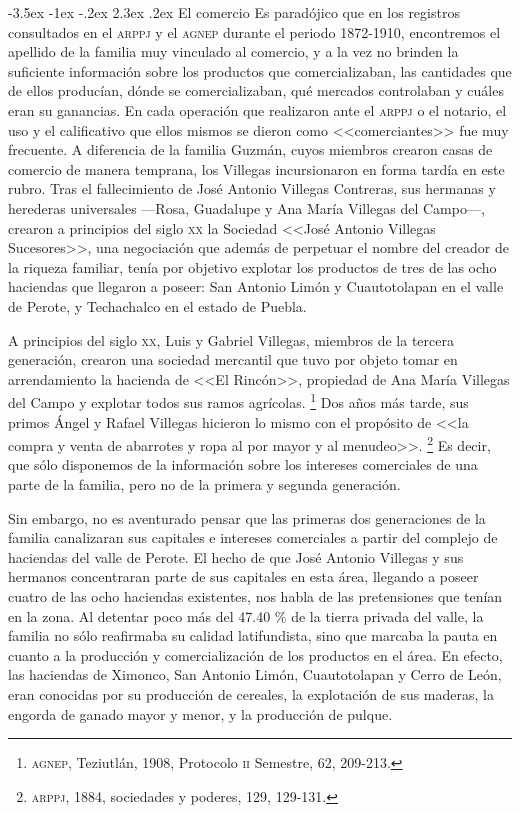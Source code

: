 \documentclass[14pt,twoside,final]{extbook} %
\makeatletter
\let\oldfootnote\footnote
\renewcommand\footnote[1]{%
\oldfootnote{\hspace{1mm}#1}}
\renewcommand\section{\@startsection {section}{1}{\z@}%
                                     {-3.5ex \@plus -1ex \@minus -.2ex}%
                                     {2.3ex \@plus .2ex}%
                                     {\normalfont\large\bfseries\sc}}
\makeatother
\begin{document}
\section{El comercio}\label{sec:el-comercio}
Es paradójico que en los registros consultados en el \textsc{arppj} y el \textsc{agnep} durante el
periodo 1872-1910, encontremos el apellido de la familia muy vinculado al comercio, y a la vez no brinden la suficiente información sobre los productos que comercializaban, las cantidades que de ellos producían, dónde se comercializaban, qué mercados controlaban y cuáles eran su ganancias. En cada operación que realizaron ante el \textsc{arppj} o el notario, el uso y el calificativo que ellos mismos se dieron como <<comerciantes>> fue muy frecuente. A diferencia de la familia Guzmán, cuyos miembros crearon casas de comercio de manera temprana, los Villegas incursionaron en forma tardía en este rubro. Tras el fallecimiento de José Antonio Villegas Contreras, sus hermanas y herederas universales ---Rosa, Guadalupe y Ana María Villegas del Campo---, crearon a principios del siglo \textsc{xx} la Sociedad <<José Antonio Villegas Sucesores>>, una negociación que además de perpetuar el nombre del creador de la riqueza familiar, tenía por objetivo explotar los productos de tres de las ocho haciendas que llegaron a poseer: San Antonio Limón y Cuautotolapan en el valle de Perote, y Techachalco en el estado de Puebla.

A principios del siglo \textsc{xx}, Luis y Gabriel Villegas, miembros de la tercera generación, crearon una sociedad mercantil que tuvo por objeto tomar en arrendamiento la hacienda de <<El Rincón>>, propiedad de Ana María Villegas del Campo y explotar todos sus ramos agrícolas.\footnote{\textsc{agnep}, Teziutlán, 1908, Protocolo \textsc{ii} Semestre, 62, 209-213.} Dos años más tarde, sus primos Ángel y Rafael Villegas hicieron lo mismo con el propósito de <<la compra y venta de abarrotes y ropa al por mayor y al menudeo>>.\footnote{\textsc{arppj}, 1884, sociedades y poderes, 129, 129-131.} Es decir, que sólo disponemos de la información sobre los intereses comerciales de una parte de la familia, pero no de la primera y segunda generación.

Sin embargo, no es aventurado pensar que las primeras dos generaciones de la familia canalizaran sus capitales e intereses comerciales a partir del complejo de haciendas del valle de Perote. El hecho de que José Antonio Villegas y sus hermanos concentraran parte de sus capitales en esta área, llegando a poseer cuatro de las ocho haciendas existentes, nos habla de las pretensiones que tenían en la zona. Al detentar poco más del 47.40 \% de la tierra privada del valle, la familia no sólo reafirmaba su
calidad latifundista, sino que marcaba la pauta en cuanto a la producción y comercialización de los productos en el área. En efecto, las haciendas de Ximonco, San Antonio Limón, Cuautotolapan y Cerro de León, eran conocidas por su producción de cereales, la explotación de sus maderas, la engorda de ganado mayor y menor, y la producción de pulque.
\end{document}
